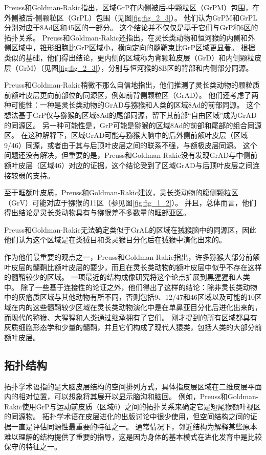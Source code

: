 Preuss和Goldman-Rakic指出，区域GrP在内侧被后-中颗粒区（GrPM）包围，在外侧被后-侧颗粒区（GrPL）包围（见图\ref{fig:fig_2_3}）。
他们认为GrPM和GrPL分别对应于8Ad区和45区的一部分。
这个结论并不仅仅是基于它们与GrP和6区的拓扑关系。
Preuss和Goldman-Rakic还指出，在灵长类动物和恒河猴的内侧和外侧区域中，锥形细胞比GrP区域小，横向定向的髓鞘束比GrP区域更显著。
根据类似的基础，他们得出结论，更内侧的区域称为背颗粒皮层（GrD）和内侧颗粒皮层（GrM）（见图\ref{fig:fig_2_3}），分别与恒河猴的8B区的背部和内侧部分同源。


Preuss和Goldman-Rakic稍微不那么自信地指出，他们推测了灵长类动物的颗粒质前额叶皮层更向前部位的同源区，例如前背侧颗粒区（GrAD）。
他们还考虑了两种可能性：一种是灵长类动物的GrAD与猕猴和人类的区域8Ad的前部同源。
这个想法基于GrP仅与猕猴的区域8Ad的尾部同源，留下其前部“自由区域”成为GrAD的同源区。
另一种可能性是，GrP可能是猕猴的区域8Ad的前部和尾部的组合同源区。
在这种解释下，区域GrAD可能与猕猴大脑中的后外侧前额叶皮层（区域9/46）同源，或者由于其与后顶叶皮层之间的联系不强，与额极皮层同源\cite{preuss2007evolutionary}。
这个问题还没有解决，但重要的是，Preuss和Goldman-Rakic没有发现GrAD与中侧前额叶皮层（区域46）对应的证据，这个结论受到了区域GrAD与后顶叶皮层之间连接较弱的支持。


至于眶额叶皮质，Preuss和Goldman-Rakic建议，灵长类动物的腹侧颗粒区（GrV）可能对应于猕猴的11区（参见图\ref{fig:fig_1_2}）。
并且，总体而言，他们得出结论是灵长类动物具有与猕猴差不多数量的眶部亚区。


Preuss和Goldman-Rakic无法确定类似于GrAL的区域在狨猴脑中的同源区，因此他们认为这个区域是在类狨目和类灵猴目分化后在狨猴中演化出来的。


作为他们最重要的观点之一，Preuss和Goldman-Rakic指出，许多猕猴大部分前额叶皮层的髓鞘比额叶皮层的要少，而且在灵长类动物的额叶皮层中似乎不存在这样的髓鞘较少的区域。
一项最近的结构成像研究将这个论点扩展到黑猩猩和人类中\cite{glasser2011comparative}。
除了一些基于连接性的论证之外，他们得出了这样的结论：除非灵长类动物中的灰瘤质区域与其他动物有所不同，否则包括9、12/47和46区域以及可能的10区域在内的这些髓鞘较少区域在灵长类动物演化中是在单鼻亚目分化后进化出来的，而现代的猕猴、大猩猩和人类通过继承拥有了它们。
刚才提到的所有区域都具有灰质细胞形态学和少量的髓鞘，并且它们构成了现代人猿类，包括人类的大部分前额叶皮层。


\subsection{拓扑结构}
拓扑学术语指的是大脑皮层结构的空间排列方式，具体指皮层区域在二维皮层平面内的相对位置，可以想象将其展开以显示脑沟和脑回。
例如，Preuss和Goldman-Rakic使用GrP与运动前皮质（区域6）之间的拓扑关系来确定它是短尾猴额叶视区的同源物。
拓扑学术语在皮层进化的出版讨论中很少使用，但空间结构之间的证据一直是评估同源性最重要的特征之一。
通常情况下，邻近结构为解释某些原本难以理解的结构提供了重要的指导，这是因为身体的基本模式在进化发育中是比较保守的特征之一。



